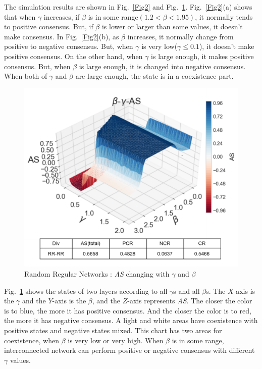 \documentclass[english]{cccconf}
\begin{document}
The simulation results are shown in Fig.~\ref{Fig2} and Fig.~\ref{Fig3}. Fig.~\ref{Fig2}(a) shows that when $\gamma$ increases, if $\beta$ is in some range$(1.2 < \beta < 1.95)$, it normally tends to positive consensus. But, if $\beta$ is lower or larger than some values, it doesn't make consensus.
In Fig.~\ref{Fig2}(b), as $\beta$ increases, it normally change from positive to negative consensus. But, when $\gamma$ is very low($\gamma \le 0.1$), it doesn't make positive consensus. On the other hand, when $\gamma$ is large enough, it makes positive consensus. But, when $\beta$ is large enough, it is changed into negative consensus. When both of $\gamma$ and $\beta$ are large enough, the state is in a coexistence part.
 
\begin{figure}[!htb]
	\centering
	\includegraphics[width=\hsize]{FIG3.png}
	\caption{Random Regular Networks : \textit{AS} changing with $\gamma$ and $\beta$}
	\label{Fig3}
\end{figure}

Fig.~\ref{Fig3} shows the states of two layers according to all $\gamma$s and all $\beta$s. The $X$-axis is the $\gamma$ and the $Y$-axis is the $\beta$, and the $Z$-axis represents \textit{AS}. The closer the color is to blue, the more it has positive consensus. And the closer the color is to red, the more it has negative consensus. A light and white areas have coexistence with positive states and negative states mixed. This chart has two areas for coexistence, when $\beta$ is very low or very high. When $\beta$ is in some range, interconnected network can perform positive or negative consensus with different $\gamma$ values.     
\end{document}
